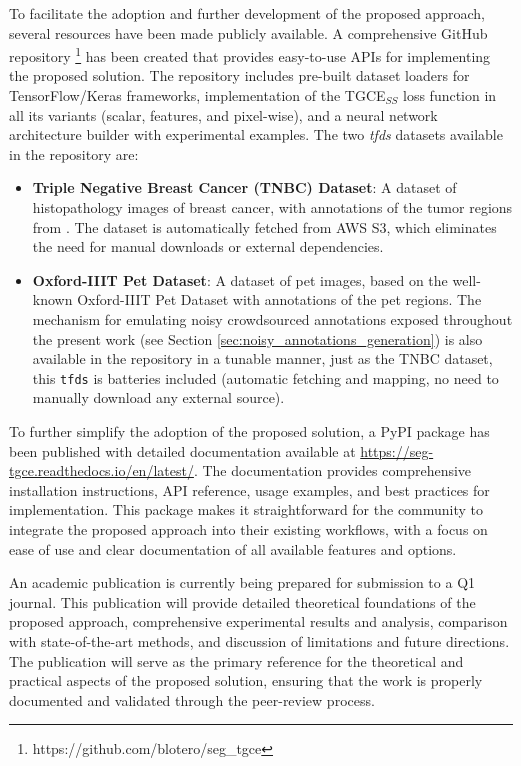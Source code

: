 To facilitate the adoption and further development of the proposed approach,
several resources have been made publicly available. A comprehensive GitHub
repository \footnote{https://github.com/blotero/seg\_tgce} has been
created that provides easy-to-use APIs for implementing
the proposed solution. The repository includes pre-built dataset loaders for
TensorFlow/Keras frameworks, implementation of the TGCE$_{SS}$ loss function
in all its variants (scalar, features, and pixel-wise), and a neural network
architecture builder with experimental examples.
The two \textit{tfds} datasets available in the repository are:
\begin{itemize}
  \item \textbf{Triple Negative Breast Cancer (TNBC) Dataset}: A dataset of
    histopathology images of breast cancer, with annotations of the tumor
    regions from \cite{LopezEtAl2024}.
    The dataset is automatically fetched from AWS S3, which
    eliminates the need for manual downloads or external dependencies.
  \item \textbf{Oxford-IIIT Pet Dataset}: A dataset of pet
    images, based on the well-known Oxford-IIIT Pet Dataset with
    annotations of the pet regions.
    The mechanism for emulating noisy crowdsourced annotations
    exposed throughout the present work (see Section
    \ref{sec:noisy_annotations_generation}) is also available in the
    repository in a tunable manner, just as the TNBC dataset, this
    \texttt{tfds} is batteries included (automatic fetching and
    mapping, no need to manually download any external source).
\end{itemize}

To further simplify the adoption of the proposed solution, a PyPI package
has been published with detailed documentation available at
\url{https://seg-tgce.readthedocs.io/en/latest/}. The documentation
provides comprehensive installation instructions, API reference, usage
examples, and best practices for implementation. This package makes it
straightforward for the community to integrate the proposed approach into
their existing workflows, with a focus on ease of use and clear
documentation of all available features and options.

An academic publication is currently being prepared for submission to a Q1
journal. This publication will provide detailed theoretical foundations of
the proposed approach, comprehensive experimental results and analysis,
comparison with state-of-the-art methods, and discussion of limitations
and future directions. The publication will serve as the primary reference
for the theoretical and practical aspects of the proposed solution,
ensuring that the work is properly documented and validated through the
peer-review process.

